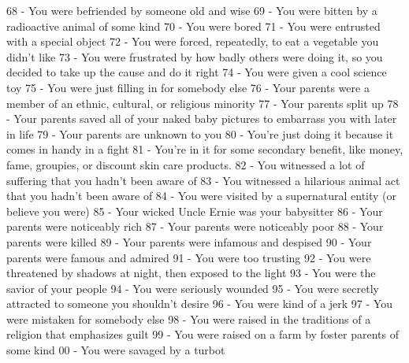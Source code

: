 \begin{tabular}
68 - You were befriended by someone old and
wise
69 - You were bitten by a radioactive animal of
some kind
70 - You were bored
71 - You were entrusted with a special object
72 - You were forced, repeatedly, to eat a vegetable
you didn't like
73 - You were frustrated by how badly others were
doing it, so you decided to take up the cause
and do it right
74 - You were given a cool science toy
75 - You were just filling in for somebody else
76 - Your parents were a member of an ethnic,
cultural, or religious minority
77 - Your parents split up
78 - Your parents saved all of your naked baby
pictures to embarrass you with later in life
79 - Your parents are unknown to you
80 - You're just doing it because it comes in
handy in a fight
81 - You're in it for some secondary benefit, like
money, fame, groupies, or discount skin care
products.
82 - You witnessed a lot of suffering that you
hadn't been aware of
83 - You witnessed a hilarious animal act
that you hadn't been aware of
84 - You were visited by a supernatural
entity (or believe you were)
85 - Your wicked Uncle Ernie was
your babysitter
86 - Your parents were noticeably rich
87 - Your parents were noticeably poor
88 - Your parents were killed
89 - Your parents were infamous and despised
90 - Your parents were famous and admired
91 - You were too trusting
92 - You were threatened by shadows at night,
then exposed to the light
93 - You were the savior of your people
94 - You were seriously wounded
95 - You were secretly attracted to someone
you shouldn't desire
96 - You were kind of a jerk
97 - You were mistaken for somebody else
98 - You were raised in the traditions of a
religion that emphasizes guilt
99 - You were raised on a farm by foster
parents of some kind
00 - You were savaged by a turbot


\end{tabular}
